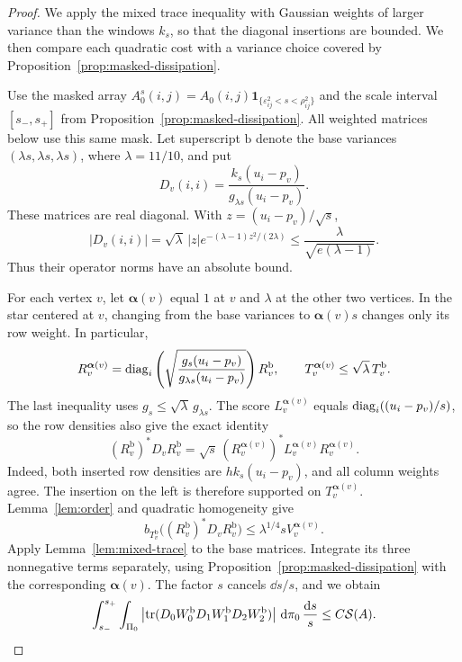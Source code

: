 \begin{proof}
We apply the mixed trace inequality with Gaussian weights of larger
variance than the windows $k_s$, so that the diagonal insertions are
bounded. We then compare each quadratic cost with a variance choice
covered by Proposition~\ref{prop:masked-dissipation}.

Use the masked array
$A_0^s(i,j)=A_0(i,j)\mathbf1_{\{\varepsilon_{ij}^2<s<\rho_{ij}^2\}}$
and the scale interval $[s_-,s_+]$ from
Proposition~\ref{prop:masked-dissipation}. All weighted matrices below use
this same mask. Let superscript $\mathrm b$ denote the base variances
$(\lambda s,\lambda s,\lambda s)$, where $\lambda=11/10$, and put
\[
 D_v(i,i)=\frac{k_s(u_i-p_v)}{g_{\lambda s}(u_i-p_v)}.
\]
These matrices are real diagonal. With $z=(u_i-p_v)/\sqrt{s}$,
\[
 |D_v(i,i)|=\sqrt\lambda\,|z|
       e^{-(\lambda-1)z^2/(2\lambda)}
 \le\frac{\lambda}{\sqrt{e(\lambda-1)}}.
\]
Thus their operator norms have an absolute bound.

For each vertex $v$, let $\boldsymbol\alpha(v)$ equal $1$ at $v$ and
$\lambda$ at the other two vertices. In the star centered at $v$, changing
from the base variances to $\boldsymbol\alpha(v)s$ changes only its row
weight. In particular,
\[
 R_v^{\boldsymbol\alpha(v)}
 =\operatorname{diag}_i\left(\sqrt{\frac{g_s(u_i-p_v)}
                             {g_{\lambda s}(u_i-p_v)}}\right)R_v^{\mathrm b},
 \qquad
 T_v^{\boldsymbol\alpha(v)}\le\sqrt\lambda\,T_v^{\mathrm b}.
\]
The last inequality uses $g_s\le\sqrt\lambda\,g_{\lambda s}$.
The score $L_v^{\boldsymbol\alpha(v)}$ equals
$\operatorname{diag}_i((u_i-p_v)/s)$, so the row densities also give the exact identity
\begin{equation}\label{eq:maximal-window-score}
 (R_v^{\mathrm b})^*D_vR_v^{\mathrm b}
 =\sqrt{s}\,(R_v^{\boldsymbol\alpha(v)})^*
           L_v^{\boldsymbol\alpha(v)}R_v^{\boldsymbol\alpha(v)}.
\end{equation}
Indeed, both inserted row densities are $h k_s(u_i-p_v)$, and all column
weights agree. The insertion on the left is therefore supported on
$T_v^{\boldsymbol\alpha(v)}$. Lemma~\ref{lem:order} and quadratic
homogeneity give
\[
 b_{T_v^{\mathrm b}}\bigl((R_v^{\mathrm b})^*D_vR_v^{\mathrm b}\bigr)
 \le\lambda^{1/4}s V_v^{\boldsymbol\alpha(v)}.
\]
Apply Lemma~\ref{lem:mixed-trace} to the base matrices. Integrate its three
nonnegative terms separately, using Proposition~\ref{prop:masked-dissipation}
with the corresponding $\boldsymbol\alpha(v)$. The factor $s$ cancels
$\dd s/s$, and we obtain
\begin{equation}\label{eq:masked-window-integral}
 \int_{s_-}^{s_+}\int_{\Pi_0}
 \left|\operatorname{tr}(D_0W_0^{\mathrm b}D_1W_1^{\mathrm b}D_2W_2^{\mathrm b})\right|
       \,\mathop{}\!\mathrm d\pi_0\,\frac{\mathop{}\!\mathrm d s}{s}
 \le C\mathcal S(A).
\end{equation}


\end{proof}
